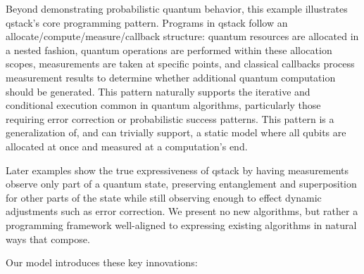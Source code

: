 Beyond demonstrating probabilistic quantum behavior, this example illustrates qstack's core programming pattern. Programs in qstack follow an allocate/compute/measure/callback structure: quantum resources are allocated in a nested fashion, quantum operations are performed within these allocation scopes, measurements are taken at specific points, and classical callbacks process measurement results to determine whether additional quantum computation should be generated. This pattern naturally supports the iterative and conditional execution common in quantum algorithms, particularly those requiring error correction or probabilistic success patterns. This pattern is a generalization of, and can trivially support, a static model where all qubits are allocated at once and measured at a computation's end.


Later examples show the true expressiveness of qstack by having measurements observe only part of a quantum state, preserving entanglement and superposition for other parts of the state while still observing enough to effect dynamic adjustments such as error correction. We present no new algorithms, but rather a programming framework well-aligned to expressing existing algorithms in natural ways that compose.

Our model introduces these key innovations:


